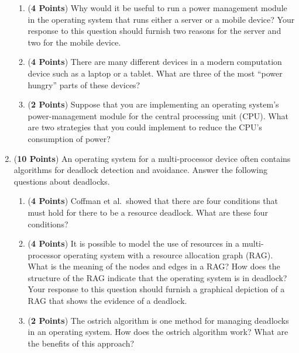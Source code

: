 \documentclass[12pt,epsf,psfig,graphics]{article}
\begin{document}
\begin{enumerate}
\begin{enumerate}
    \item ({\bf 4 Points}) Why would it be useful to run a power management module in the operating system that runs
      either a server or a mobile device? Your response to this question should furnish two reasons for the server and
      two for the mobile device.

    \item ({\bf 4 Points}) There are many different devices in a modern computation device such as a laptop or a tablet.
      What are three of the most ``power hungry'' parts of these devices? 

    \item ({\bf 2 Points}) Suppose that you are implementing an operating system's power-management module for the
      central processing unit (CPU).  What are two strategies that you could implement to reduce the CPU's consumption
      of power?

  \end{enumerate}

  \newpage

\item ({\bf 10 Points}) An operating system for a multi-processor device often contains algorithms for deadlock
  detection and avoidance.  Answer the following questions about deadlocks.

  \begin{enumerate}

    \item ({\bf 4 Points}) Coffman et al.\ showed that there are four conditions that must hold for there to be a
      resource deadlock. What are these four conditions?

    \item ({\bf 4 Points}) It is possible to model the use of resources in a multi-processor operating system with a
      resource allocation graph (RAG).  What is the meaning of the nodes and edges in a RAG?  How does the structure of
      the RAG indicate that the operating system is in deadlock? Your response to this question should furnish a
      graphical depiction of a RAG that shows the evidence of a deadlock.

    \item ({\bf 2 Points}) The ostrich algorithm is one method for managing deadlocks in an operating system.  How does
      the ostrich algorithm work? What are the benefits of this approach?

  \end{enumerate}


\end{enumerate}
\end{document}
